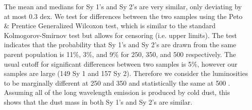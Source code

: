 The mean and medians for Sy 1's and Sy 2's are very similar, only deviating by at most 0.3 dex. We test for differences between the two samples using the Peto \& Prentice Generalized Wilcoxon test, which is similar to the standard Kolmogorov-Smirnov test but allows for censoring (i.e. upper limits). The test indicates that the probability that Sy 1's and Sy 2's are drawn from the same parent population is 11\%, 3\%, and 9\% for 250, 350, and 500 \um{} respectively. The usual cutoff for significant differences between two samples is 5\%, however our samples are large (149 Sy 1 and 157 Sy 2). Therefore we consider the luminosities to be marginally different at 250 and 350 \um{} and statistically the same at 500 \um. Assuming all of the long wavelength emission is produced by cold dust, this shows that the dust mass in both Sy 1's and Sy 2's are similar. 
  